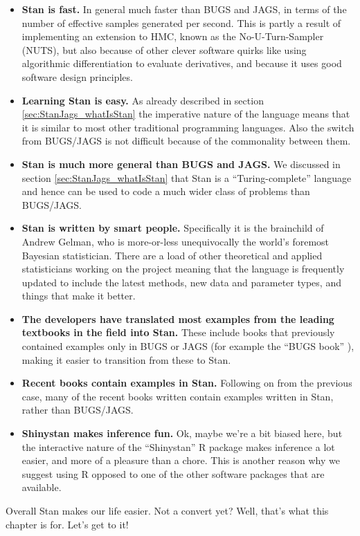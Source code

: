 \documentclass[11pt,fullpage]{book}
\begin{document}
\begin{itemize}
\item \textbf{Stan is fast.} In general much faster than BUGS and JAGS, in terms of the number of effective samples generated per second. This is partly a result of implementing an extension to HMC, known as the No-U-Turn-Sampler (NUTS), but also because of other clever software quirks like using algorithmic differentiation to evaluate derivatives, and because it uses good software design principles.
\item \textbf{Learning Stan is easy.} As already described in section \ref{sec:StanJags_whatIsStan} the imperative nature of the language means that it is similar to most other traditional programming languages. Also the switch from BUGS/JAGS is not difficult because of the commonality between them.
\item \textbf{Stan is much more general than BUGS and JAGS.} We discussed in section \ref{sec:StanJags_whatIsStan} that Stan is a ``Turing-complete'' language and hence can be used to code a much wider class of problems than BUGS/JAGS.
\item \textbf{Stan is written by smart people.} Specifically it is the brainchild of Andrew Gelman, who is more-or-less unequivocally the world's foremost Bayesian statistician. There are a load of other theoretical and applied statisticians working on the project meaning that the language is frequently updated to include the latest methods, new data and parameter types, and things that make it better.
\item \textbf{The developers have translated most examples from the leading textbooks in the field into Stan.} These include books that previously contained examples only in BUGS or JAGS (for example the ``BUGS book'' \cite{lunn2012bugs}), making it easier to transition from these to Stan.
\item \textbf{Recent books contain examples in Stan.} Following on from the previous case, many of the recent books written contain examples written in Stan, rather than BUGS/JAGS.
\item \textbf{Shinystan makes inference fun.} Ok, maybe we're a bit biased here, but the interactive nature of the ``Shinystan'' R package makes inference a lot easier, and more of a pleasure than a chore. This is another reason why we suggest using R opposed to one of the other software packages that are available. 
\end{itemize}

Overall Stan makes our life easier. Not a convert yet? Well, that's what this chapter is for. Let's get to it!
\end{document}
